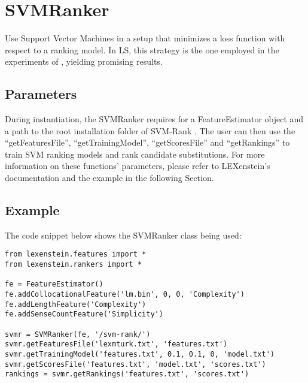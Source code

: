 \section{SVMRanker}

Use Support Vector Machines in a setup that minimizes a loss function with respect to a ranking model. In LS, this strategy is the one employed in the experiments of \cite{Horn2014}, yielding promising results.

\subsection{Parameters}

During instantiation, the SVMRanker requires for a FeatureEstimator object and a path to the root installation folder of SVM-Rank \cite{svmrank}. The user can then use the ``getFeaturesFile'', ``getTrainingModel'', ``getScoresFile'' and ``getRankings'' to train SVM ranking models and rank candidate substitutions. For more information on these functions' parameters, please refer to LEXenstein's documentation and the example in the following Section.

\subsection{Example}

The code snippet below shows the SVMRanker class being used:

\begin{lstlisting}
from lexenstein.features import *
from lexenstein.rankers import *

fe = FeatureEstimator()
fe.addCollocationalFeature('lm.bin', 0, 0, 'Complexity')
fe.addLengthFeature('Complexity')
fe.addSenseCountFeature('Simplicity')

svmr = SVMRanker(fe, '/svm-rank/')
svmr.getFeaturesFile('lexmturk.txt', 'features.txt')
svmr.getTrainingModel('features.txt', 0.1, 0.1, 0, 'model.txt')
svmr.getScoresFile('features.txt', 'model.txt', 'scores.txt')
rankings = svmr.getRankings('features.txt', 'scores.txt')
\end{lstlisting}



















